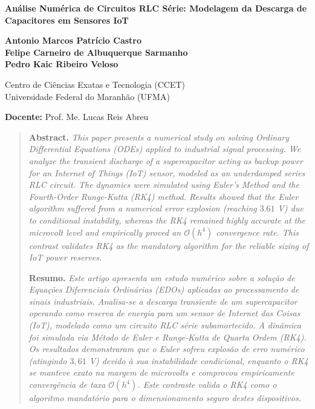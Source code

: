\documentclass[11pt, a4paper]{article}
\begin{document}
\begin{center}
    {\Large \bfseries Análise Numérica de Circuitos RLC Série: Modelagem da Descarga de Capacitores em Sensores IoT\par}
    \vspace{0.8cm}
    
    {\normalsize     
    \textbf{Antonio Marcos Patrício Castro}\\
    \textbf{Felipe Carneiro de Albuquerque Sarmanho} \\
    \textbf{Pedro Kaic Ribeiro Veloso}
    \par}
    \vspace{0.4cm}
    
    {\normalsize Centro de Ciências Exatas e Tecnologia (CCET) \\
    Universidade Federal do Maranhão (UFMA)\par}
    \vspace{0.2cm}
    
    {\normalsize \textbf{Docente:} Prof. Me. Lucas Reis Abreu\par}
\end{center}

\vspace{0.2cm}

\begin{quote}
    \noindent\small
    \textbf{Abstract.} \textit{This paper presents a numerical study on solving Ordinary Differential Equations (ODEs) applied to industrial signal processing. We analyze the transient discharge of a supercapacitor acting as backup power for an Internet of Things (IoT) sensor, modeled as an underdamped series RLC circuit. The dynamics were simulated using Euler's Method and the Fourth-Order Runge-Kutta (RK4) method. Results showed that the Euler algorithm suffered from a numerical error explosion (reaching $3.61$ V) due to conditional instability, whereas the RK4 remained highly accurate at the microvolt level and empirically proved an $\mathcal{O}(h^4)$ convergence rate. This contrast validates RK4 as the mandatory algorithm for the reliable sizing of IoT power reserves.}
    
    \vspace{0.3cm} %
    
    \noindent
    \textbf{Resumo.} \textit{Este artigo apresenta um estudo numérico sobre a solução de Equações Diferenciais Ordinárias (EDOs) aplicadas ao processamento de sinais industriais. Analisa-se a descarga transiente de um supercapacitor operando como reserva de energia para um sensor de Internet das Coisas (IoT), modelado como um circuito RLC série subamortecido. A dinâmica foi simulada via Método de Euler e Runge-Kutta de Quarta Ordem (RK4). Os resultados demonstraram que o Euler sofreu explosão de erro numérico (atingindo $3{,}61$ V) devido à sua instabilidade condicional, enquanto o RK4 se manteve exato na margem de microvolts e comprovou empiricamente convergência de taxa $\mathcal{O}(h^4)$. Este contraste valida o RK4 como o algoritmo mandatório para o dimensionamento seguro destes dispositivos.}
\end{quote}
\end{document}
